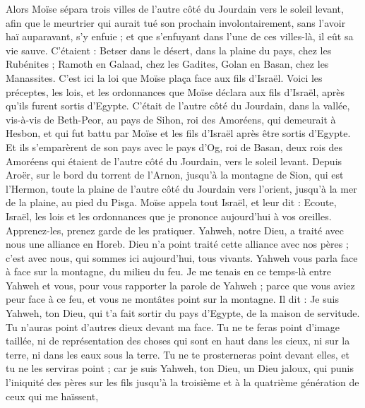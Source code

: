 \begin{multicols}{2}
Alors Moïse sépara trois villes de l’autre côté du Jourdain vers le soleil levant,
afin que le meurtrier qui aurait tué son prochain involontairement, sans l'avoir haï auparavant, s'y enfuie ; et que s’enfuyant dans l'une de ces villes-là, il eût sa vie sauve.
C’étaient : Betser dans le désert, dans la plaine du pays, chez les Rubénites ; Ramoth en Galaad, chez les Gadites, Golan en Basan, chez les Manassites.
C'est ici la loi que Moïse plaça face aux fils d'Israël.
Voici les préceptes, les lois, et les ordonnances que Moïse déclara aux fils d'Israël, après qu'ils furent sortis d'Egypte.
C’était de l’autre côté du Jourdain, dans la vallée, vis-à-vis de Beth-Peor, au pays de Sihon, roi des Amoréens, qui demeurait à Hesbon, et qui fut battu par Moïse et les fils d'Israël après être sortis d'Egypte.
Et ils s’emparèrent de son pays avec le pays d’Og, roi de Basan, deux rois des Amoréens qui étaient de l’autre côté du Jourdain, vers le soleil levant.
Depuis Aroër, sur le bord du torrent de l'Arnon, jusqu'à la montagne de Sion, qui est l’Hermon,
toute la plaine de l’autre côté du Jourdain vers l'orient, jusqu'à la mer de la plaine, au pied du Pisga.
\VerseOne{}Moïse appela tout Israël, et leur dit : Ecoute, Israël, les lois et les ordonnances que je prononce aujourd'hui à vos oreilles. Apprenez-les, prenez garde de les pratiquer.
Yahweh, notre Dieu, a traité avec nous une alliance en Horeb.
Dieu n'a point traité cette alliance avec nos pères ; c’est avec nous, qui sommes ici aujourd'hui, tous vivants.
Yahweh vous parla face à face sur la montagne, du milieu du feu.
Je me tenais en ce temps-là entre Yahweh et vous, pour vous rapporter la parole de Yahweh ; parce que vous aviez peur face à ce feu, et vous ne montâtes point sur la montagne. Il dit :
Je suis Yahweh, ton Dieu, qui t’a fait sortir du pays d'Egypte, de la maison de servitude.
Tu n'auras point d'autres dieux devant ma face.
Tu ne te feras point d'image taillée, ni de représentation des choses qui sont en haut dans les cieux, ni sur la terre, ni dans les eaux sous la terre.
Tu ne te prosterneras point devant elles, et tu ne les serviras point ; car je suis Yahweh, ton Dieu, un Dieu jaloux, qui punis l'iniquité des pères sur les fils jusqu'à la troisième et à la quatrième génération de ceux qui me haïssent,

\end{multicols}
